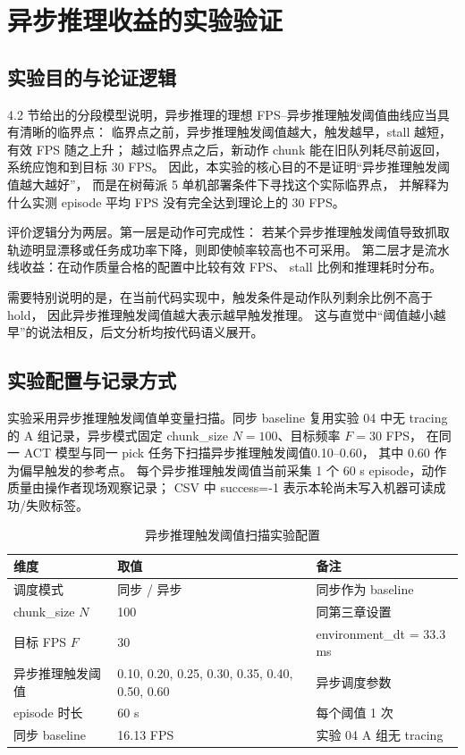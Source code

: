 \section{异步推理收益的实验验证}\label{sec:async-exp}

\subsection{实验目的与论证逻辑}\label{sec:async-exp-purpose}

4.2 节给出的分段模型说明，异步推理的理想 FPS--异步推理触发阈值曲线应当具有清晰的临界点：
临界点之前，异步推理触发阈值越大，触发越早，stall 越短，有效 FPS 随之上升；
越过临界点之后，新动作 chunk 能在旧队列耗尽前返回，系统应饱和到目标 30 FPS。
因此，本实验的核心目的不是证明“异步推理触发阈值越大越好”，
而是在树莓派 5 单机部署条件下寻找这个实际临界点，
并解释为什么实测 episode 平均 FPS 没有完全达到理论上的 30 FPS。

评价逻辑分为两层。第一层是动作可完成性：
若某个异步推理触发阈值导致抓取轨迹明显漂移或任务成功率下降，则即使帧率较高也不可采用。
第二层才是流水线收益：在动作质量合格的配置中比较有效 FPS、
stall 比例和推理耗时分布。

需要特别说明的是，在当前代码实现中，触发条件是动作队列剩余比例不高于 hold，
因此异步推理触发阈值越大表示越早触发推理。
这与直觉中“阈值越小越早”的说法相反，后文分析均按代码语义展开。

\subsection{实验配置与记录方式}\label{sec:async-exp-design}

实验采用异步推理触发阈值单变量扫描。同步 baseline 复用实验 04 中无 tracing 的
A 组记录，异步模式固定 chunk\_size $N=100$、目标频率 $F=30$ FPS，
在同一 ACT 模型与同一 pick 任务下扫描异步推理触发阈值0.10--0.60，
其中 0.60 作为偏早触发的参考点。
每个异步推理触发阈值当前采集 1 个 60 s episode，动作质量由操作者现场观察记录；
CSV 中 success=-1 表示本轮尚未写入机器可读成功/失败标签。

\begin{table}[htbp]
  \centering
  \caption{异步推理触发阈值扫描实验配置}
  \label{tab:async-exp-config}
  \begin{tabularx}{\textwidth}{@{}p{}Xp{}@{}}
  \toprule
  维度 & 取值 & 备注 \\
  \midrule
  调度模式 & 同步 / 异步 & 同步作为 baseline \\
  chunk\_size $N$ & 100 & 同第三章设置 \\
  目标 FPS $F$ & 30 & environment\_dt = 33.3 ms \\
  异步推理触发阈值 & 0.10, 0.20, 0.25, 0.30, 0.35, 0.40, 0.50, 0.60 & 异步调度参数 \\
  episode 时长 & 60 s & 每个阈值 1 次 \\
  同步 baseline & 16.13 FPS & 实验 04 A 组无 tracing \\
  \bottomrule
  \end{tabularx}
\end{table}

